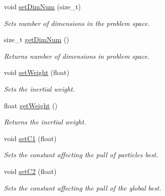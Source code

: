 \begin{DoxyCompactItemize}
void \mbox{\hyperlink{classSwarm_ad8214af418b80dc9a6f2d72ce2aeb5d4}{set\+Dim\+Num}} (size\+\_\+t)
\begin{DoxyCompactList}\small\item\em Sets number of dimensions in the problem space. \end{DoxyCompactList}\item 
\mbox{\label{classSwarm_a67216923375508354de94e35f4ceca8f}} 
size\+\_\+t \mbox{\hyperlink{classSwarm_a67216923375508354de94e35f4ceca8f}{get\+Dim\+Num}} ()
\begin{DoxyCompactList}\small\item\em Returns number of dimensions in problem space. \end{DoxyCompactList}\item 
\mbox{\label{classSwarm_ab899e656cc249d574c203baf550d5539}} 
void \mbox{\hyperlink{classSwarm_ab899e656cc249d574c203baf550d5539}{set\+Weight}} (float)
\begin{DoxyCompactList}\small\item\em Sets the inertial weight. \end{DoxyCompactList}\item 
\mbox{\label{classSwarm_a690d1c6e3e0836be6a01149188703f64}} 
float \mbox{\hyperlink{classSwarm_a690d1c6e3e0836be6a01149188703f64}{get\+Weight}} ()
\begin{DoxyCompactList}\small\item\em Returns the inertial weight. \end{DoxyCompactList}\item 
\mbox{\label{classSwarm_a1ffb11d74e5e7241dee7d977d20c4419}} 
void \mbox{\hyperlink{classSwarm_a1ffb11d74e5e7241dee7d977d20c4419}{set\+C1}} (float)
\begin{DoxyCompactList}\small\item\em Sets the constant affecting the pull of particles\textquotesingle{} best. \end{DoxyCompactList}\item 
\mbox{\label{classSwarm_ac9cc13ae5b9f2d323c0cf272d5c864d6}} 
void \mbox{\hyperlink{classSwarm_ac9cc13ae5b9f2d323c0cf272d5c864d6}{set\+C2}} (float)
\begin{DoxyCompactList}\small\item\em Sets the constant affecting the pull of the global best. \end{DoxyCompactList}\item 

\end{DoxyCompactItemize}
